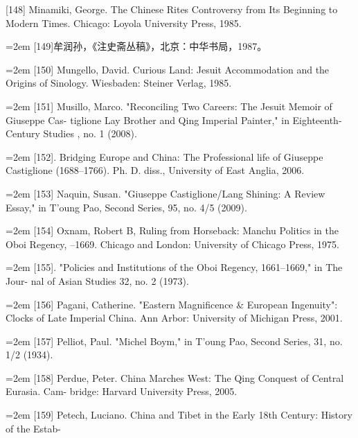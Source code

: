[148] Minamiki, George. The Chinese Rites Controversy from Its Beginning to Modern%
\space%
Times. Chicago: Loyola University Press, 1985.%
\par
\noindent\hangindent=2em
[149]牟润孙，《注史斋丛稿》，北京：中华书局，1987。%
\par
\noindent\hangindent=2em
[150] Mungello, David. Curious Land: Jesuit Accommodation and the Origins of Sinology.%
\space%
Wiesbaden: Steiner Verlag, 1985.%
\par
\noindent\hangindent=2em
[151] Musillo, Marco. "Reconciling Two Careers: The Jesuit Memoir of Giuseppe Cas-%
tiglione Lay Brother and Qing Imperial Painter," in Eighteenth-Century Studies%
, no. 1 (2008).%
\par
\noindent\hangindent=2em
[152]. Bridging Europe and China: The Professional life of Giuseppe Castiglione%
(1688–1766). Ph. D. diss., University of East Anglia, 2006.%
\par
\noindent\hangindent=2em
[153] Naquin, Susan. "Giuseppe Castiglione/Lang Shining: A Review Essay," in T'oung%
\space%
Pao, Second Series, 95, no. 4/5 (2009).%
\par
\noindent\hangindent=2em
[154] Oxnam, Robert B, Ruling from Horseback: Manchu Politics in the Oboi Regency,%
–1669. Chicago and London: University of Chicago Press, 1975.%
\par
\noindent\hangindent=2em
[155]. "Policies and Institutions of the Oboi Regency, 1661–1669," in The Jour-%
nal of Asian Studies 32, no. 2 (1973).%
\par
\noindent\hangindent=2em
[156] Pagani, Catherine. "Eastern Magnificence \& European Ingenuity": Clocks of Late%
\space%
Imperial China. Ann Arbor: University of Michigan Press, 2001.%
\par
\noindent\hangindent=2em
[157] Pelliot, Paul. "Michel Boym," in T’oung Pao, Second Series, 31, no. 1/2 (1934).%
\par
\noindent\hangindent=2em
[158] Perdue, Peter. China Marches West: The Qing Conquest of Central Eurasia. Cam-%
bridge: Harvard University Press, 2005.%
\par
\noindent\hangindent=2em
[159] Petech, Luciano. China and Tibet in the Early 18th Century: History of the Estab-%
